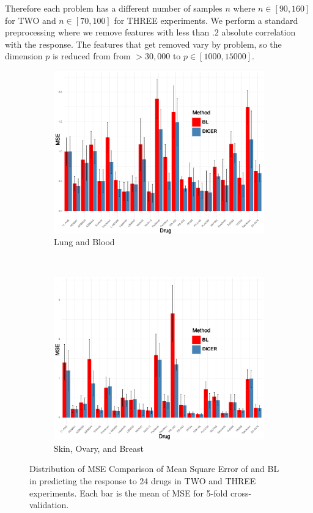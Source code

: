 Therefore each problem has a different number of samples $n$ where $n \in [90, 160]$ for TWO and $n \in [70, 100]$ for THREE experiments.
We perform a standard preprocessing \cite{barretina2012cancer} where we remove features with less than $.2$ absolute correlation with the response.%
The features that get removed vary by problem, so the dimension $p$ is reduced from from $>30,000$ to $p \in [1000, 15000]$. 
	\begin{figure}
	\centering
	\begin{subfigure}[b]{0.22\textwidth}
		\includegraphics[width=\textwidth]{./img/lung-blood-barplot.pdf}
		\caption{Lung and Blood}\label{fig:two}
	\end{subfigure} ~
	\begin{subfigure}[b]{0.22\textwidth}
		\includegraphics[width=\textwidth]{./img/skin-ovary-breast.pdf}
		\caption{Skin, Ovary, and Breast}\label{fig:three}
	\end{subfigure}
	\squeezeup
	\caption{Distribution of MSE Comparison of Mean Square Error of \dc{} and BL in predicting the response to 24 drugs in TWO and THREE experiments. Each bar is the mean of MSE for 5-fold cross-validation.}
	\label{fig syn2}
\end{figure}
